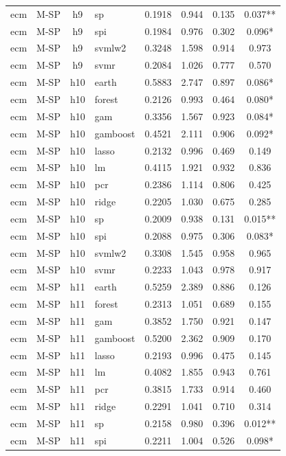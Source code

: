 \begin{ThreePartTable}
\begin{longtable}[t]{llclcccc}
ecm & M-SP & h9 & sp & 0.1918 & 0.944 & 0.135 & 0.037**\\
ecm & M-SP & h9 & spi & 0.1984 & 0.976 & 0.302 & 0.096*\\
ecm & M-SP & h9 & svmlw2 & 0.3248 & 1.598 & 0.914 & 0.973\\
ecm & M-SP & h9 & svmr & 0.2084 & 1.026 & 0.777 & 0.570\\
\addlinespace
ecm & M-SP & h10 & earth & 0.5883 & 2.747 & 0.897 & 0.086*\\
ecm & M-SP & h10 & forest & 0.2126 & 0.993 & 0.464 & 0.080*\\
ecm & M-SP & h10 & gam & 0.3356 & 1.567 & 0.923 & 0.084*\\
ecm & M-SP & h10 & gamboost & 0.4521 & 2.111 & 0.906 & 0.092*\\
ecm & M-SP & h10 & lasso & 0.2132 & 0.996 & 0.469 & 0.149\\
ecm & M-SP & h10 & lm & 0.4115 & 1.921 & 0.932 & 0.836\\
ecm & M-SP & h10 & pcr & 0.2386 & 1.114 & 0.806 & 0.425\\
ecm & M-SP & h10 & ridge & 0.2205 & 1.030 & 0.675 & 0.285\\
ecm & M-SP & h10 & sp & 0.2009 & 0.938 & 0.131 & 0.015**\\
ecm & M-SP & h10 & spi & 0.2088 & 0.975 & 0.306 & 0.083*\\
ecm & M-SP & h10 & svmlw2 & 0.3308 & 1.545 & 0.958 & 0.965\\
ecm & M-SP & h10 & svmr & 0.2233 & 1.043 & 0.978 & 0.917\\
\addlinespace
ecm & M-SP & h11 & earth & 0.5259 & 2.389 & 0.886 & 0.126\\
ecm & M-SP & h11 & forest & 0.2313 & 1.051 & 0.689 & 0.155\\
ecm & M-SP & h11 & gam & 0.3852 & 1.750 & 0.921 & 0.147\\
ecm & M-SP & h11 & gamboost & 0.5200 & 2.362 & 0.909 & 0.170\\
ecm & M-SP & h11 & lasso & 0.2193 & 0.996 & 0.475 & 0.145\\
ecm & M-SP & h11 & lm & 0.4082 & 1.855 & 0.943 & 0.761\\
ecm & M-SP & h11 & pcr & 0.3815 & 1.733 & 0.914 & 0.460\\
ecm & M-SP & h11 & ridge & 0.2291 & 1.041 & 0.710 & 0.314\\
ecm & M-SP & h11 & sp & 0.2158 & 0.980 & 0.396 & 0.012**\\
ecm & M-SP & h11 & spi & 0.2211 & 1.004 & 0.526 & 0.098*\\

\end{longtable}
\end{ThreePartTable}
